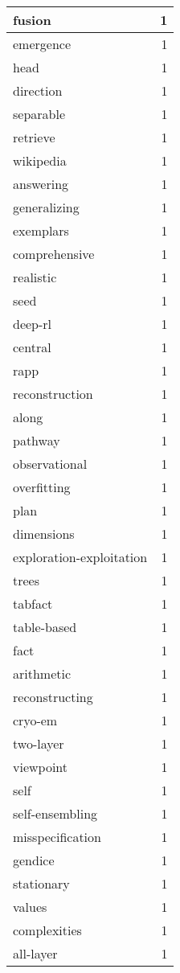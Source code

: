 \begin{table}[h]
\begin{tabular}{|l|r|}
\hline
fusion & 1 \\
\hline
emergence & 1 \\
\hline
head & 1 \\
\hline
direction & 1 \\
\hline
separable & 1 \\
\hline
retrieve & 1 \\
\hline
wikipedia & 1 \\
\hline
answering & 1 \\
\hline
generalizing & 1 \\
\hline
exemplars & 1 \\
\hline
comprehensive & 1 \\
\hline
realistic & 1 \\
\hline
seed & 1 \\
\hline
deep-rl & 1 \\
\hline
central & 1 \\
\hline
rapp & 1 \\
\hline
reconstruction & 1 \\
\hline
along & 1 \\
\hline
pathway & 1 \\
\hline
observational & 1 \\
\hline
overfitting & 1 \\
\hline
plan & 1 \\
\hline
dimensions & 1 \\
\hline
exploration-exploitation & 1 \\
\hline
trees & 1 \\
\hline
tabfact & 1 \\
\hline
table-based & 1 \\
\hline
fact & 1 \\
\hline
arithmetic & 1 \\
\hline
reconstructing & 1 \\
\hline
cryo-em & 1 \\
\hline
two-layer & 1 \\
\hline
viewpoint & 1 \\
\hline
self & 1 \\
\hline
self-ensembling & 1 \\
\hline
misspecification & 1 \\
\hline
gendice & 1 \\
\hline
stationary & 1 \\
\hline
values & 1 \\
\hline
complexities & 1 \\
\hline
all-layer & 1 \\

\end{tabular}
\end{table}
